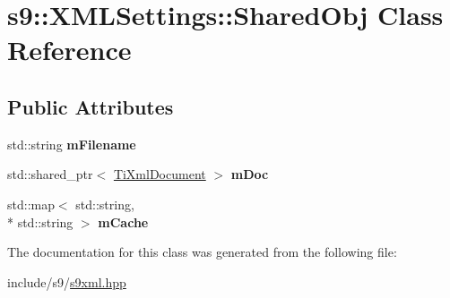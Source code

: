 \hypertarget{classs9_1_1XMLSettings_1_1SharedObj}{\section{s9\-:\-:X\-M\-L\-Settings\-:\-:Shared\-Obj Class Reference}
\label{classs9_1_1XMLSettings_1_1SharedObj}
}
\subsection*{Public Attributes}
\begin{DoxyCompactItemize}
\item 
\hypertarget{classs9_1_1XMLSettings_1_1SharedObj_a4538f061d6c2df6b363d5f67d055235d}{std\-::string {\bfseries m\-Filename}}\label{classs9_1_1XMLSettings_1_1SharedObj_a4538f061d6c2df6b363d5f67d055235d}

\item 
\hypertarget{classs9_1_1XMLSettings_1_1SharedObj_a7bbd8ebe1ba95eeaeff3678f4fdb6798}{std\-::shared\-\_\-ptr$<$ \hyperlink{classTiXmlDocument}{Ti\-Xml\-Document} $>$ {\bfseries m\-Doc}}\label{classs9_1_1XMLSettings_1_1SharedObj_a7bbd8ebe1ba95eeaeff3678f4fdb6798}

\item 
\hypertarget{classs9_1_1XMLSettings_1_1SharedObj_a57a7a739f31c72de40a6e0981874e792}{std\-::map$<$ std\-::string, \\*
std\-::string $>$ {\bfseries m\-Cache}}\label{classs9_1_1XMLSettings_1_1SharedObj_a57a7a739f31c72de40a6e0981874e792}

\end{DoxyCompactItemize}


The documentation for this class was generated from the following file\-:\begin{DoxyCompactItemize}
\item 
include/s9/\hyperlink{s9xml_8hpp}{s9xml.\-hpp}\end{DoxyCompactItemize}
